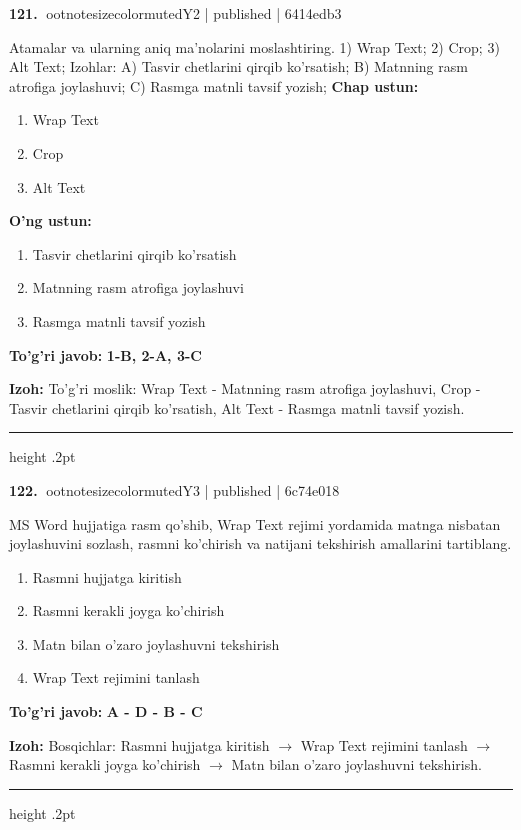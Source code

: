 \documentclass[10pt,a4paper]{article}
\begin{document}
\textbf{\color{ink}121.} {ootnotesizecolor{muted}Y2 | published | 6414edb3}
\par
Atamalar va ularning aniq ma'nolarini moslashtiring.  1) Wrap Text;  2) Crop;  3) Alt Text;  Izohlar: A) Tasvir chetlarini qirqib ko'rsatish;  B) Matnning rasm atrofiga joylashuvi;  C) Rasmga matnli tavsif yozish;
\textbf{Chap ustun:}\begin{enumerate}[label=\arabic*),leftmargin=9mm]
\item Wrap Text
\item Crop
\item Alt Text
\end{enumerate}
\textbf{O'ng ustun:}\begin{enumerate}[label=\Alph*),leftmargin=9mm]
\item Tasvir chetlarini qirqib ko'rsatish
\item Matnning rasm atrofiga joylashuvi
\item Rasmga matnli tavsif yozish
\end{enumerate}
\begin{tcolorbox}[enhanced,breakable,colback=teal!4,colframe=teal!55!black,boxrule=0.45pt,arc=1.2mm,left=2.8mm,right=2.8mm,top=2mm,bottom=2mm]
\textbf{\color{teal}To'g'ri javob:} \textbf{1-B, 2-A, 3-C}
\par\smallskip
\textbf{Izoh:} To'g'ri moslik: Wrap Text - Matnning rasm atrofiga joylashuvi, Crop - Tasvir chetlarini qirqib ko'rsatish, Alt Text - Rasmga matnli tavsif yozish.
\end{tcolorbox}
\vspace{2mm}\hrule height .2pt\vspace{2mm}

\textbf{\color{ink}122.} {ootnotesizecolor{muted}Y3 | published | 6c74e018}
\par
MS Word hujjatiga rasm qo'shib, Wrap Text rejimi yordamida matnga nisbatan joylashuvini sozlash, rasmni ko'chirish va natijani tekshirish amallarini tartiblang.
\begin{enumerate}[label=\Alph*),leftmargin=9mm]
\item Rasmni hujjatga kiritish
\item Rasmni kerakli joyga ko'chirish
\item Matn bilan o'zaro joylashuvni tekshirish
\item Wrap Text rejimini tanlash
\end{enumerate}
\begin{tcolorbox}[enhanced,breakable,colback=teal!4,colframe=teal!55!black,boxrule=0.45pt,arc=1.2mm,left=2.8mm,right=2.8mm,top=2mm,bottom=2mm]
\textbf{\color{teal}To'g'ri javob:} \textbf{A - D - B - C}
\par\smallskip
\textbf{Izoh:} Bosqichlar: Rasmni hujjatga kiritish \ensuremath{\rightarrow} Wrap Text rejimini tanlash \ensuremath{\rightarrow} Rasmni kerakli joyga ko'chirish \ensuremath{\rightarrow} Matn bilan o'zaro joylashuvni tekshirish.
\end{tcolorbox}
\vspace{2mm}\hrule height .2pt\vspace{2mm}
\end{document}
